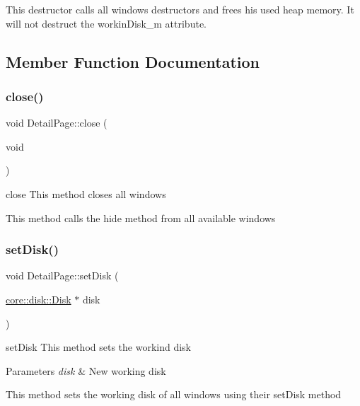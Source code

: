 This destructor calls all windows destructors and frees his used heap memory. It will not destruct the workin\+Disk\+\_\+m attribute. 

\subsection{Member Function Documentation}
\mbox{\label{classui_1_1window_1_1_detail_page_a2eba9774cf72106a5b87357c2348f5ae}} 
\subsubsection{\texorpdfstring{close()}{close()}}
{\footnotesize\ttfamily void Detail\+Page\+::close (\begin{DoxyParamCaption}\item[{void}]{ }\end{DoxyParamCaption})}



close This method closes all windows 

This method calls the hide method from all available windows \mbox{\label{classui_1_1window_1_1_detail_page_ad677d96003c9405071abed57a2310c9d}} 
\subsubsection{\texorpdfstring{set\+Disk()}{setDisk()}}
{\footnotesize\ttfamily void Detail\+Page\+::set\+Disk (\begin{DoxyParamCaption}\item[{\mbox{\hyperlink{classcore_1_1disk_1_1_disk}{core\+::disk\+::\+Disk}} $\ast$}]{disk }\end{DoxyParamCaption})}



set\+Disk This method sets the workind disk 


\begin{DoxyParams}{Parameters}
{\em disk} & New working disk\\
\hline
\end{DoxyParams}
This method sets the working disk of all windows using their set\+Disk method \mbox{\label{classui_1_1window_1_1_detail_page_a1bbc24ad94c66e55e29ba208586a5bf5}} 
